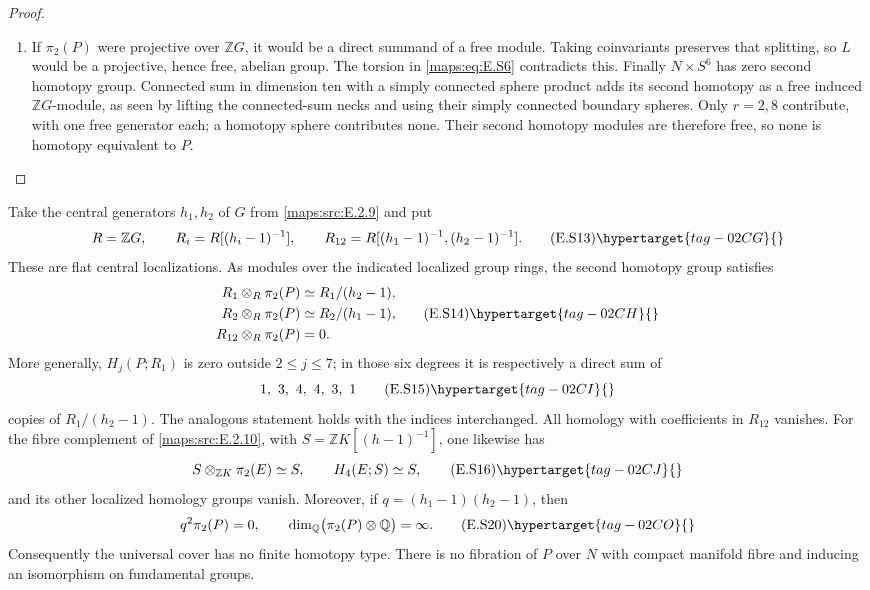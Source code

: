\begin{proof}
\begin{enumerate}[label={$\langle1\rangle$\arabic*.},leftmargin=*]
\item If $\pi_2(P)$ were projective over $\mathbb ZG$, it would be
a direct summand of a free module. Taking coinvariants preserves
that splitting, so $L$ would be a projective, hence free,
abelian group. The torsion in \eqref{maps:eq:E.S6} contradicts this. Finally
$N\times S^6$ has zero second homotopy group. Connected sum in
dimension ten with a simply connected sphere product adds its
second homotopy as a free induced $\mathbb ZG$-module, as seen
by lifting the connected-sum necks and using their simply
connected boundary spheres. Only $r=2,8$ contribute, with one
free generator each; a homotopy sphere contributes none.
Their second homotopy modules are therefore free, so none is
homotopy equivalent to $P$.

\end{enumerate}
\end{proof}

\begin{theorem}\hypertarget{tag-02MC}{}\label{maps:src:E.2.12}


Take the central generators $h_1,h_2$ of $G$ from \ref{maps:src:E.2.9} and put
\[
 R=\mathbb ZG,\qquad R_i=R[(h_i-1)^{-1}],\qquad
              R_{12}=R[(h_1-1)^{-1},(h_2-1)^{-1}].
 \tag{E.S13}\hypertarget{tag-02CG}{}\label{maps:eq:E.S13}
\]
These are flat central localizations. As modules over the indicated
localized group rings, the second homotopy group satisfies
\[
 \begin{split}
 R_1\otimes_R\pi_2(P)&\simeq R_1/(h_2-1),\\
 R_2\otimes_R\pi_2(P)&\simeq R_2/(h_1-1),\\
 R_{12}\otimes_R\pi_2(P)&=0.
 \end{split}
 \tag{E.S14}\hypertarget{tag-02CH}{}\label{maps:eq:E.S14}
\]
More generally, $H_j(P;R_1)$ is zero outside $2\leq j\leq7$;
in those six degrees it is respectively a direct sum of
\[
                  1,\ 3,\ 4,\ 4,\ 3,\ 1
 \tag{E.S15}\hypertarget{tag-02CI}{}\label{maps:eq:E.S15}
\]
copies of $R_1/(h_2-1)$. The analogous statement holds with the
indices interchanged. All homology with coefficients in $R_{12}$
vanishes. For the fibre complement of \ref{maps:src:E.2.10}, with
$S=\mathbb ZK[(h-1)^{-1}]$, one likewise has
\[
             S\otimes_{\mathbb ZK}\pi_2(E)\simeq S,
       \qquad H_4(E;S)\simeq S,
 \tag{E.S16}\hypertarget{tag-02CJ}{}\label{maps:eq:E.S16}
\]
and its other localized homology groups vanish. Moreover, if
$q=(h_1-1)(h_2-1)$, then
\[
                  q^2\pi_2(P)=0,
        \qquad \dim_{\mathbb Q}\bigl(\pi_2(P)\otimes\mathbb Q\bigr)
                     =\infty.
 \tag{E.S20}\hypertarget{tag-02CO}{}\label{maps:eq:E.S20}
\]
Consequently the universal cover has no finite homotopy type.
There is no fibration of $P$ over $N$ with compact manifold fibre
and inducing an isomorphism on fundamental groups.

\end{theorem}


